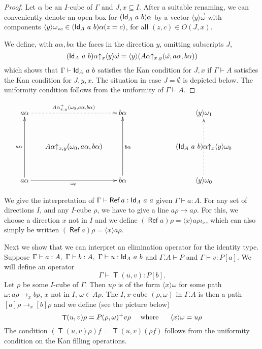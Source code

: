 \documentclass[10pt,a4paper]{article}
\DeclareMathOperator{\Ref}{\mathsf{Ref}}
\DeclareMathOperator{\Transp}{\mathsf{T}}
\newcommand{\Id}{{\sf Id}}
\newcommand{\es}{\emptyset}
\newcommand{\rupx}[1]{#1{\uparrow_{x}}}
\newcommand{\rupxy}[1]{#1{\uparrow_{x,y}}}
\newcommand{\bind}[2]{{\langle}#1{\rangle}#2}
\begin{document}
\begin{proof}
  Let $\alpha$ be an $I$-cube of $\Gamma$ and $J,x\subseteq I$. After
  a suitable renaming, we can conveniently denote an open box for
  $(\Id_A~a~b)\alpha$ by a vector $\bind{y}{\vec{\omega}}$ with
  components $\bind{y}{\omega_{zc}}\in(\Id_A~a~b)\alpha(z=c)$, for all
  $(z,c)\in O(J,x)$.

  We define, with $a\alpha,b\alpha$ the faces in the direction $y$,
  omitting subscripts $J$,
  $$
  \rupx{(\Id_A~a~b)\alpha}\bind{y}{\vec{\omega}} =
  \bind{y}{(\rupxy{A\alpha} (\vec{\omega},a\alpha,b\alpha))}
  $$
  which shows that $\Gamma\vdash \Id_A~a~b$ satisfies the Kan
  condition for $J,x$ if $\Gamma\vdash A$ satisfies the Kan condition for
  $J,y,x$. The situation in case $J=\es$ is depicted below.  The
  uniformity condition follows from the uniformity of $\Gamma\vdash A$.
\end{proof}
\[
\xymatrix@R=1.1cm@C=.6cm{
a\alpha\ar@{.>}[rr]^{A\alpha_{x,y}^+(\omega_0,a\alpha,b\alpha)}&      & b\alpha                                     &&&
\bind{y}{\omega_1}                                &          \\
                                      &\rupxy{A\alpha}(\omega_0,a\alpha,b\alpha)&                          &&&
                                      \rupx{(\Id_A~a~b)\alpha} \bind{y}{\omega_0}&                           \\
a\alpha\ar[rr]_{\omega_0}\ar[uu]^{a\alpha}&      & b\alpha\ar[uu]_{b\alpha}                                     &&&
\bind{y}{\omega_0}\ar@{.>}[uu]     &                             \\
}
\]

We give the interpretation of $\Gamma\vdash \Ref a:\Id_A~a~a$ given
$\Gamma\vdash a:A$. For any set of directions $I$, and any $I$-cube
$\rho$, we have to give a line $a\rho\to a\rho$. For this, we choose a
direction $x$ not in $I$ and we define 
$(\Ref a)\rho = \bind{x}{a\rho\iota_x}$, 
which can also simply be written $(\Ref a)\rho = \bind{x}{a\rho}$.

Next we show that we can interpret an elimination operator for the
identity type.  Suppose $\Gamma\vdash a:A,~\Gamma\vdash
b:A,~\Gamma\vdash u:\Id_A~a~b$ and $\Gamma.A\vdash P$ and
$\Gamma\vdash v:P[a]$. We will define an operator
$$
\Gamma\vdash \Transp(u,v):P[b].
$$
Let $\rho$ be some $I$-cube of $\Gamma$. Then $u\rho$ is of the form
$\bind{x}{\omega}$ for some path $\omega:a\rho\to _x b\rho$, $x$ not
in $I$, $\omega\in A\rho$.  The $I,x$-cube $(\rho ,\omega)$ in
$\Gamma.A$ is then a path $[a]\rho\to _x [b]\rho$ and we define (see
the picture below)
$$
\Transp(u,v)\rho = P(\rho ,\omega)^+ v\rho~~~~{\rm
  where~~~~~}\bind{x}{\omega} = u\rho
$$
The condition $(\Transp(u,v)\rho)f = \Transp(u,v)(\rho f)$ follows
from the uniformity condition on the Kan filling operations.
\end{document}
